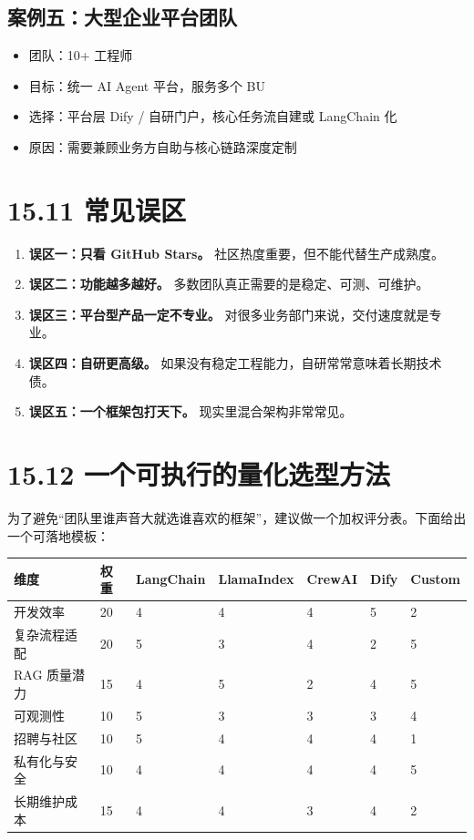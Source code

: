 \subsection{案例五：大型企业平台团队}

\begin{itemize}[leftmargin=2em]
\item 团队：10+ 工程师
\item 目标：统一 AI Agent 平台，服务多个 BU
\item 选择：平台层 Dify / 自研门户，核心任务流自建或 LangChain 化
\item 原因：需要兼顾业务方自助与核心链路深度定制
\end{itemize}

\section{15.11 常见误区}

\begin{enumerate}[leftmargin=2em]
\item \textbf{误区一：只看 GitHub Stars。} 社区热度重要，但不能代替生产成熟度。
\item \textbf{误区二：功能越多越好。} 多数团队真正需要的是稳定、可测、可维护。
\item \textbf{误区三：平台型产品一定不专业。} 对很多业务部门来说，交付速度就是专业。
\item \textbf{误区四：自研更高级。} 如果没有稳定工程能力，自研常常意味着长期技术债。
\item \textbf{误区五：一个框架包打天下。} 现实里混合架构非常常见。
\end{enumerate}

\section{15.12 一个可执行的量化选型方法}

为了避免``团队里谁声音大就选谁喜欢的框架''，建议做一个加权评分表。下面给出一个可落地模板：


\begingroup
\scriptsize
\setlength{\tabcolsep}{3pt}
\begin{longtable}{|p{}|p{}|p{}|p{}|p{}|p{}|p{}|}
\hline
维度 & 权重 & LangChain & LlamaIndex & CrewAI & Dify & Custom \\ \hline
开发效率 & 20 & 4 & 4 & 4 & 5 & 2 \\ \hline
复杂流程适配 & 20 & 5 & 3 & 4 & 2 & 5 \\ \hline
RAG 质量潜力 & 15 & 4 & 5 & 2 & 4 & 5 \\ \hline
可观测性 & 10 & 5 & 3 & 3 & 3 & 4 \\ \hline
招聘与社区 & 10 & 5 & 4 & 4 & 4 & 1 \\ \hline
私有化与安全 & 10 & 4 & 4 & 4 & 4 & 5 \\ \hline
长期维护成本 & 15 & 4 & 4 & 3 & 4 & 2 \\ \hline
\end{longtable}
\endgroup

